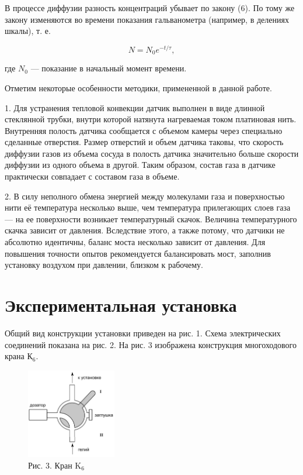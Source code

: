 \documentclass[a4paper,12pt]{article} %
\begin{document}
В процессе диффузии разность концентраций убывает по закону (6). По тому же закону изменяются во времени показания гальванометра (например, в делениях шкалы), т. е.



\begin{equation}
	N = N_{0}e^{-t/\tau},
\end{equation}


\noindent где $N_{0}$ — показание в начальный момент времени.


\vspace{5mm}
Отметим некоторые особенности методики, примененной в данной работе.


1. Для устранения тепловой конвекции датчик выполнен в виде длинной стеклянной трубки, внутри которой натянута нагреваемая током платиновая нить. Внутренняя полость датчика сообщается с объемом камеры через специально сделанные отверстия. Размер отверстий и объем датчика таковы, что скорость диффузии газов из объема сосуда в полость датчика значительно больше скорости диффузии из одного объема в другой. Таким образом, состав газа в датчике практически совпадает с составом газа в объеме.


2. В силу неполного обмена энергией между молекулами газа и поверхностью нити её температура несколько выше, чем температура прилегающих слоев газа — на ее поверхности возникает температурный скачок. Величина температурного скачка зависит от давления. Вследствие этого, а также потому, что датчики не абсолютно идентичны, баланс моста несколько зависит от давления. Для повышения точности опытов рекомендуется балансировать мост, заполнив установку воздухом при давлении, близком к рабочему.

\newpage
\section*{Экспериментальная установка}
Общий вид конструкции установки приведен на рис. 1. Схема электрических соединений показана на рис. 2. На рис. 3 изображена конструкция многоходового крана К$_{6}$.


\begin{figure}
	\includegraphics[width=0.35\textwidth]{Pictures/Рис3.png}
	\caption*{\footnotesize{Рис. 3. Кран K$_{6}$}}
\end{figure}
\end{document}
